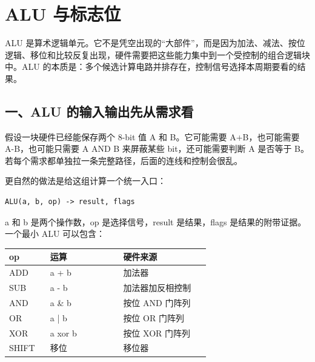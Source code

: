 \chapter{ALU 与标志位}

ALU 是算术逻辑单元。它不是凭空出现的“大部件”，而是因为加法、减法、按位逻辑、移位和比较反复出现，硬件需要把这些能力集中到一个受控制的组合逻辑块中。ALU 的本质是：多个候选计算电路并排存在，控制信号选择本周期要看的结果。

\section{一、ALU 的输入输出先从需求看}

假设一块硬件已经能保存两个 8-bit 值 A 和 B。它可能需要 A+B，也可能需要 A-B，也可能只需要 A AND B 来屏蔽某些 bit，还可能需要判断 A 是否等于 B。若每个需求都单独拉一条完整路径，后面的连线和控制会很乱。

更自然的做法是给这组计算一个统一入口：

\begin{lstlisting}
ALU(a, b, op) -> result, flags
\end{lstlisting}

a 和 b 是两个操作数，op 是选择信号，result 是结果，flags 是结果的附带证据。一个最小 ALU 可以包含：

\begin{longtable}{p{0.18\linewidth}p{0.32\linewidth}p{0.38\linewidth}}
\toprule
op & 运算 & 硬件来源 \\
\midrule
ADD & a + b & 加法器 \\
SUB & a - b & 加法器加反相控制 \\
AND & a \& b & 按位 AND 门阵列 \\
OR & a | b & 按位 OR 门阵列 \\
XOR & a xor b & 按位 XOR 门阵列 \\
SHIFT & 移位 & 移位器 \\
\bottomrule
\end{longtable}


